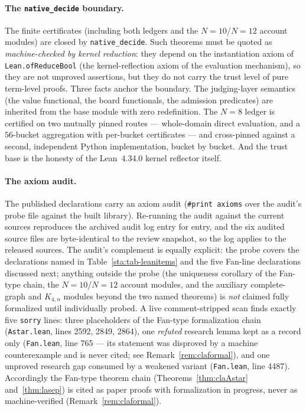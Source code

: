 \paragraph{The \texttt{native\_decide} boundary.} The finite certificates
(including both ledgers and the $N=10$/$N=12$ account modules) are closed by
\texttt{native\_decide}. Such theorems must be quoted as \emph{machine-checked
by kernel reduction}: they depend on the instantiation axiom of
\texttt{Lean.ofReduceBool} (the kernel-reflection axiom of the evaluation
mechanism), so they are not unproved assertions, but they do not carry the
trust level of pure term-level proofs. Three facts anchor the boundary. The
judging-layer semantics (the value functional, the board functionals, the
admission predicates) are inherited from the base module with zero
redefinition. The $N=8$ ledger is certified on two mutually pinned routes ---
whole-domain direct evaluation, and a $56$-bucket aggregation with per-bucket
certificates --- and cross-pinned against a second, independent Python
implementation, bucket by bucket. And the trust base is the honesty of the
Lean~4.34.0 kernel reflector itself.

\paragraph{The axiom audit.} The published declarations carry an axiom audit
(\texttt{\#print axioms} over the audit's probe file against the built
library). Re-running the audit against the current sources reproduces the
archived audit log entry for entry, and the six audited source files are
byte-identical to the review snapshot, so the log applies to the released
sources. The audit's complement is equally explicit: the probe covers the
declarations named in Table~\ref{sta:tab-leanitems} and the five Fan-line
declarations discussed next; anything outside the probe (the uniqueness
corollary of the Fan-type chain, the $N=10$/$N=12$ account modules, and the
auxiliary complete-graph and $K_{4,n}$ modules beyond the two named
theorems) is \emph{not} claimed fully formalized until individually probed.
A live comment-stripped scan finds exactly five \texttt{sorry} lines:
three placeholders of the Fan-type formalization chain
(\texttt{Astar.lean}, lines 2592, 2849, 2864), one \emph{refuted} research
lemma kept as a record only (\texttt{Fan.lean}, line 765 --- its statement
was disproved by a machine counterexample and is never cited; see
Remark~\ref{rem:claformal}), and one unproved research gap consumed by a
weakened variant (\texttt{Fan.lean}, line 4487). Accordingly the
Fan-type theorem chain
(Theorems~\ref{thm:claAstar} and~\ref{thm:lasep}) is cited as paper proofs
with formalization in progress, never as machine-verified
(Remark~\ref{rem:claformal}).

